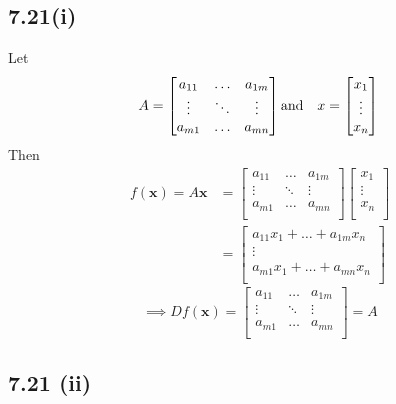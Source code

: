 \documentclass[letterpaper,12pt]{article}
\theoremstyle{definition}
\begin{document}
\subsection*{7.21(i)}
Let
\[A = 
\begin{bmatrix}
   a_{11} & \ldots & a_{1m}\\
   \vdots & \ddots & \vdots \\
   a_{m1}  & \ldots & a_{mn} \\
  \end{bmatrix}
  \text{and} \quad
  x =
  \begin{bmatrix}
   x_{1} \\
   \vdots  \\
   x_{n}   \\
  \end{bmatrix} \\
\]
Then\\ 
\begin{align*}
f(\textbf{x})=A\textbf{x}&=
\begin{bmatrix}
   a_{11} & \ldots & a_{1m}\\
   \vdots & \ddots & \vdots \\
   a_{m1}  & \ldots & a_{mn} \\
  \end{bmatrix}
  \begin{bmatrix}
   x_{1} \\
   \vdots  \\
   x_{n}   \\
  \end{bmatrix} \\
  &=\begin{bmatrix}
   a_{11}x_{1}+ \ldots + a_{1m}x_{n} \\
   \vdots  \\
   a_{m1}x_{1}+ \ldots + a_{mn}x_{n}   \\
  \end{bmatrix}
\end{align*}
\[ \implies Df(\textbf{x}) = \begin{bmatrix}
   a_{11} & \ldots & a_{1m}\\
   \vdots & \ddots & \vdots \\
   a_{m1}  & \ldots & a_{mn} \\
  \end{bmatrix} = A \] 
  \subsection*{7.21 (ii)}
  
\end{document}
